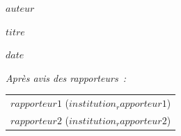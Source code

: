 \documentclass[a4paper,12pt]{reedthesis}
\begin{document}
\vspace{5mm}

\begin{center}
{\large\bf $auteur$}
\end{center}

\vspace{3mm}

\begin{center}
{\Large $titre$}
\end{center}


\vspace{10mm}

 $date$

\vspace{5mm}

\noindent
{\small \it Après avis des rapporteurs~: }
\begin{tabular}{l}
{\sc $rapporteur1$} ($institution_rapporteur1$)\vspace{1mm}  \\
{\sc $rapporteur2$} ($institution_rapporteur2$)\\
\end{tabular}

\vspace{8mm}
\end{document}
